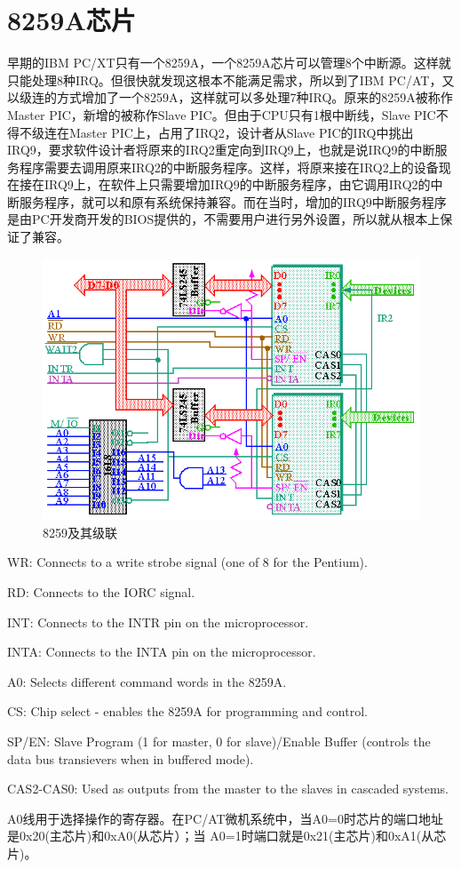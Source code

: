 \documentclass[12pt]{article}
\begin{document}
\section{8259A芯片}
早期的IBM PC/XT只有一个8259A，一个8259A芯片可以管理8个中断源。这样就只能处理8种IRQ。但很快就发现这根本不能满足需求，所以到了IBM PC/AT，又以级连的方式增加了一个8259A，这样就可以多处理7种IRQ。原来的8259A被称作Master PIC，新增的被称作Slave PIC。但由于CPU只有1根中断线，Slave PIC不得不级连在Master PIC上，占用了IRQ2，设计者从Slave PIC的IRQ中挑出IRQ9，要求软件设计者将原来的IRQ2重定向到IRQ9上，也就是说IRQ9的中断服务程序需要去调用原来IRQ2的中断服务程序。这样，将原来接在IRQ2上的设备现在接在IRQ9上，在软件上只需要增加IRQ9的中断服务程序，由它调用IRQ2的中断服务程序，就可以和原有系统保持兼容。而在当时，增加的IRQ9中断服务程序是由PC开发商开发的BIOS提供的，不需要用户进行另外设置，所以就从根本上保证了兼容。
\begin{figure}[htbp]
\centering
\includegraphics[scale=0.4]{fig/8.png}
\caption{8259及其级联}
\label{fig:8259 and its cascading}
\end{figure}
\begin{list}{•}{•}
\item WR: Connects to a write strobe signal (one of 8 for the Pentium).
\item RD: Connects to the IORC signal.
\item INT: Connects to the INTR pin on the microprocessor.
\item INTA: Connects to the INTA pin on the microprocessor.
\item A0: Selects different command words in the 8259A.
\item CS: Chip select - enables the 8259A for programming and control.
\item SP/EN: Slave Program (1 for master, 0 for slave)/Enable Buffer (controls the data bus transievers when in buffered mode).
\item CAS2-CAS0: Used as outputs from the master to the slaves in cascaded systems.
\end{list}
A0线用于选择操作的寄存器。在PC/AT微机系统中，当A0=0时芯片的端口地址是0x20(主芯片)和0xA0(从芯片）；当 A0=1时端口就是0x21(主芯片)和0xA1(从芯片)。 
\end{document}
